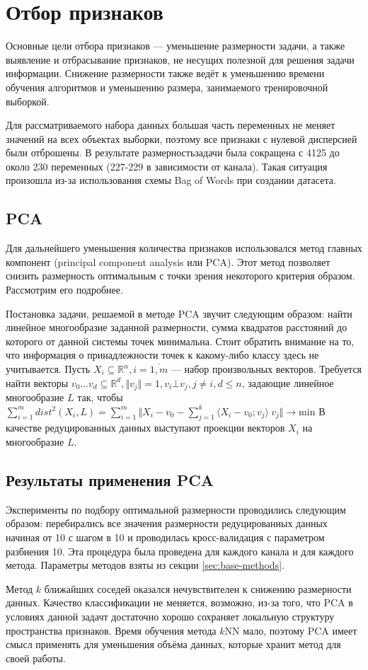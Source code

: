 \section{Отбор признаков}
Основные цели отбора признаков --- уменьшение размерности задачи, а также выявление и отбрасывание признаков, не несущих полезной для решения задачи информации. Снижение размерности также ведёт к уменьшению времени обучения алгоритмов и уменьшению размера, занимаемого тренировочной выборкой.
 \par
Для рассматриваемого набора данных большая часть переменных не меняет значений на всех объектах выборки, поэтому все признаки с нулевой дисперсией были отброшены. В результате размерностьзадачи была сокращена с 4125 до около 230 переменных (227-229 в зависимости от канала). Такая ситуация произошла из-за использования схемы Bag of Words при создании датасета.
\subsection{PCA}
Для дальнейшего уменьшения количества признаков использовался метод главных компонент (principal component analysis или PCA)\cite{pearson}. Этот метод позволяет снизить размерность оптимальным с точки зрения некоторого критерия образом. Рассмотрим его подробнее.
 \par
 Постановка задачи, решаемой в методе PCA звучит следующим образом: найти линейное многообразие заданной  размерности, сумма квадратов расстояний до которого от данной системы точек минимальна. Стоит обратить внимание на то, что информация о принадлежности точек к какому-либо классу здесь не учитывается. Пусть \( X_i \subseteq \mathbb{R}^n, i=\overline{1,m} \) --- набор произвольных векторов. Требуется найти векторы \(v_0\ldots v_d\subseteq \mathbb{R}^d, \Vert v_j \Vert = 1, v_i \bot v_j, j \neq  i, d \leq n\), задающие линейное многообразие \(L\) так, чтобы \( \sum_{i=1}^{m} dist^2(X_i, L) = \sum_{i=1}^{m}\Vert X_i - v_0 - \sum_{j=1}^k\langle X_i - v_0; v_j\rangle\ v_j \Vert\rightarrow \mathrm{min}\) В качестве редуцированных данных выступают проекции векторов \( X_i\) на многообразие \(L\). 
  
 \subsection*{Результаты применения PCA}
 Эксперименты по подбору оптимальной размерности проводились следующим образом: перебирались все значения 
 размерности редуцированных данных начиная от 10 с шагом в 10 и проводилась кросс-валидация с параметром разбиения 10. Эта процедура была проведена для каждого канала и для каждого метода. Параметры методов 
 взяты из секции \ref{sec:base-methods}.
\par
Метод \(k\) ближайших соседей оказался нечувствителен к снижению размерности данных. Качество классификации не меняется, возможно, из-за того, что PCA в условиях данной задачт достаточно хорошо сохраняет локальную структуру пространства признаков. Время обучения метода \(k\)NN мало, поэтому PCA
имеет смысл применять для уменьшения объёма данных, которые хранит метод для своей работы.

